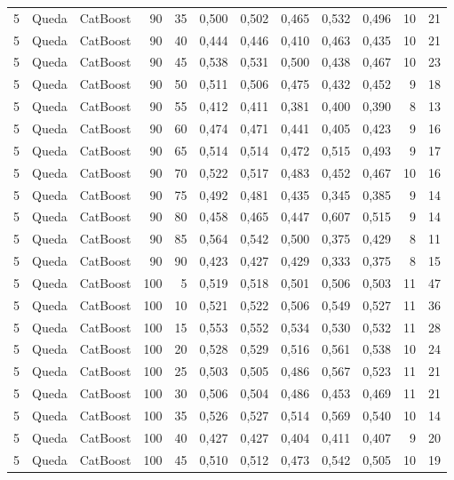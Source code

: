 \begin{longtable}{@{}rllrrrrrrrrr@{}}
5 & Queda & CatBoost & 90 & 35 & 0,500 & 0,502 & 0,465 & 0,532 & 0,496 & 10 & 21 \\
5 & Queda & CatBoost & 90 & 40 & 0,444 & 0,446 & 0,410 & 0,463 & 0,435 & 10 & 21 \\
5 & Queda & CatBoost & 90 & 45 & 0,538 & 0,531 & 0,500 & 0,438 & 0,467 & 10 & 23 \\
5 & Queda & CatBoost & 90 & 50 & 0,511 & 0,506 & 0,475 & 0,432 & 0,452 & 9 & 18 \\
5 & Queda & CatBoost & 90 & 55 & 0,412 & 0,411 & 0,381 & 0,400 & 0,390 & 8 & 13 \\
5 & Queda & CatBoost & 90 & 60 & 0,474 & 0,471 & 0,441 & 0,405 & 0,423 & 9 & 16 \\
5 & Queda & CatBoost & 90 & 65 & 0,514 & 0,514 & 0,472 & 0,515 & 0,493 & 9 & 17 \\
5 & Queda & CatBoost & 90 & 70 & 0,522 & 0,517 & 0,483 & 0,452 & 0,467 & 10 & 16 \\
5 & Queda & CatBoost & 90 & 75 & 0,492 & 0,481 & 0,435 & 0,345 & 0,385 & 9 & 14 \\
5 & Queda & CatBoost & 90 & 80 & 0,458 & 0,465 & 0,447 & 0,607 & 0,515 & 9 & 14 \\
5 & Queda & CatBoost & 90 & 85 & 0,564 & 0,542 & 0,500 & 0,375 & 0,429 & 8 & 11 \\
5 & Queda & CatBoost & 90 & 90 & 0,423 & 0,427 & 0,429 & 0,333 & 0,375 & 8 & 15 \\
5 & Queda & CatBoost & 100 & 5 & 0,519 & 0,518 & 0,501 & 0,506 & 0,503 & 11 & 47 \\
5 & Queda & CatBoost & 100 & 10 & 0,521 & 0,522 & 0,506 & 0,549 & 0,527 & 11 & 36 \\
5 & Queda & CatBoost & 100 & 15 & 0,553 & 0,552 & 0,534 & 0,530 & 0,532 & 11 & 28 \\
5 & Queda & CatBoost & 100 & 20 & 0,528 & 0,529 & 0,516 & 0,561 & 0,538 & 10 & 24 \\
5 & Queda & CatBoost & 100 & 25 & 0,503 & 0,505 & 0,486 & 0,567 & 0,523 & 11 & 21 \\
5 & Queda & CatBoost & 100 & 30 & 0,506 & 0,504 & 0,486 & 0,453 & 0,469 & 11 & 21 \\
5 & Queda & CatBoost & 100 & 35 & 0,526 & 0,527 & 0,514 & 0,569 & 0,540 & 10 & 14 \\
5 & Queda & CatBoost & 100 & 40 & 0,427 & 0,427 & 0,404 & 0,411 & 0,407 & 9 & 20 \\
5 & Queda & CatBoost & 100 & 45 & 0,510 & 0,512 & 0,473 & 0,542 & 0,505 & 10 & 19 \\

\end{longtable}
